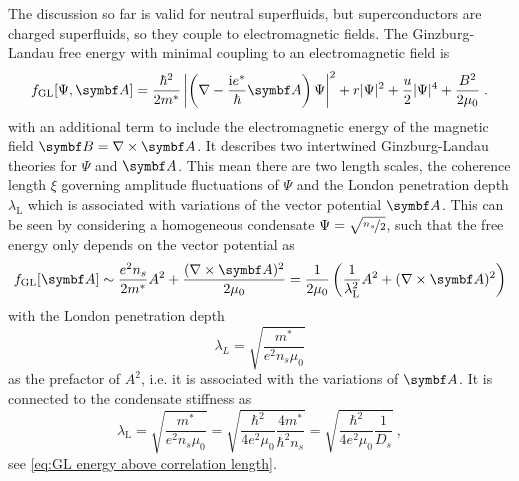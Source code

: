 \documentclass[../main.tex]{subfiles}
\begin{document}
The discussion so far is valid for neutral superfluids, but superconductors are charged superfluids, so they couple to electromagnetic fields.
The Ginzburg-Landau free energy with minimal coupling to an electromagnetic field is
\begin{equation}
	f_{\mathrm{GL}} [\Psi, \vb{A}] = \frac{\hbar^2}{2 m^*} \left\vert \left(\nabla - \frac{\iu e^*}{\hbar} \vb{A} \right) \Psi \right\vert^2 + r \vert \Psi \vert^2 + \frac{u}{2} \vert \Psi \vert^4 + \frac{B^2}{2 \mu_0}
	\label{eq:GL energy with minimal coupling to EM field} \;.
\end{equation}
with an additional term to include the electromagnetic energy of the magnetic field \(\vb{B} = \nabla \times \vb{A}\).
It describes two intertwined Ginzburg-Landau theories for \(\Psi\) and \(\vb{A}\).
This mean there are two length scales, the coherence length \(\xi\) governing amplitude fluctuations of \(\Psi\) and the London penetration depth \(\lambda_{\mathrm{L}}\) which is associated with variations of the vector potential \(\vb{A}\).
This can be seen by considering a homogeneous condensate \(\Psi = \sqrt{\nicefrac{n_s}{2}}\), such that the free energy only depends on the vector potential as
\begin{equation}
	f_{\mathrm{GL}} [\vb{A}] \sim \frac{e^2 n_s}{2 m^*} A^2 + \frac{(\nabla \times \vb{A})^2}{2 \mu_0} = \frac{1}{2 \mu_0} \left( \frac{1}{\lambda_{\mathrm{L}}^2} A^2 + (\nabla \times \vb{A})^2 \right)
\end{equation}
with the London penetration depth
\begin{equation}
	\lambda_L = \sqrt{\frac{m^*}{e^2 n_s \mu_0}}
\end{equation}
as the prefactor of \(A^2\), i.e. it is associated with the variations of \(\vb{A}\).
It is connected to the condensate stiffness as
\begin{equation}
	\lambda_{\mathrm{L}} = \sqrt{\frac{m^*}{e^2 n_s \mu_0}} = \sqrt{\frac{\hbar^2}{4 e^2 \mu_0} \frac{4 m^*}{\hbar^2 n_s}} = \sqrt{\frac{\hbar^2}{4 e^2 \mu_0} \frac{1}{D_s}} \:,
	\label{eq:London penetration depth and D_S}
\end{equation}
see \cref{eq:GL energy above correlation length}.
\end{document}
